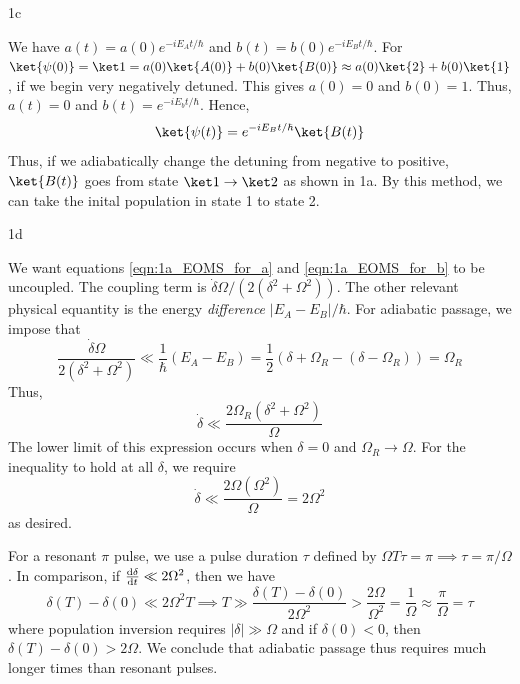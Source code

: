 \documentclass[12pt]{article}
\begin{document}
\begin{exc}{1c}

\end{exc}
\begin{ans}
    We have $a(t) = a(0)e^{-i E_At/\hbar}$ and $b(t) = b(0) e^{-i E_Bt/\hbar}$. For $\ket{\psi(0)} = \ket 1 = a(0)\ket{A(0)} + b(0) \ket{B(0)} \approx a(0)\ket{2} + b(0) \ket{1}$, if we begin very negatively detuned. This gives $a(0) = 0$ and $b(0) = 1$. Thus, $a(t) = 0$ and $b(t) = e^{-iE_bt/\hbar}$. Hence, 
    \[\ket{\psi(t)} = e^{-iE_Bt/\hbar}\ket{B(t)}\]
    Thus, if we adiabatically change the detuning from negative to positive, $\ket{B(t)}$ goes from state $\ket 1 \to \ket 2$ as shown in 1a. By this method, we can take the inital population in state 1 to state 2. 
\end{ans}


\begin{exc}{1d}

\end{exc}
\begin{ans}
    We want equations \ref{eqn:1a_EOMS_for_a} and \ref{eqn:1a_EOMS_for_b} to be uncoupled. The coupling term is $\dot \delta \Omega/(2 (\delta^2 + \Omega^2))$. The other relevant physical equantity is the energy \emph{difference} $|E_A - E_B|/\hbar$. For adiabatic passage, we impose that
    \[\frac{\dot \delta \Omega}{2 (\delta^2 + \Omega^2)} \ll \frac1\hbar(E_A - E_B) = \frac12(\delta + \Omega_R - (\delta - \Omega_R)) = \Omega_R\]
    Thus,
    \[\dot \delta \ll \frac{2\Omega_R(\delta^2 + \Omega^2)}{\Omega}\]
    The lower limit of this expression occurs when $\delta = 0$ and $\Omega_R \to \Omega$. For the inequality to hold at all $\delta$, we require 
    \[\dot \delta \ll \frac{2\Omega(\Omega^2)}{\Omega} = 2\Omega^2\]
    as desired.

    For a resonant $\pi$ pulse, we use a pulse duration $\tau$ defined by $\Omega T\tau = \pi \implies \tau = \pi/\Omega$. In comparison, if $\odv{\delta}{t} \ll 2\Omega^2$, then we have 
    \[\delta(T) - \delta(0) \ll 2\Omega^2 T \implies T \gg \frac{\delta(T) - \delta(0)}{2\Omega^2} > \frac{2\Omega}{\Omega^2} = \frac1\Omega \approx \frac{\pi}{\Omega} = \tau\]
    where population inversion requires $|\delta| \gg \Omega$ and if $\delta(0) < 0$, then $\delta(T) - \delta(0) > 2\Omega$. We conclude that adiabatic passage thus requires much longer times than resonant pulses.
\end{ans}
\end{document}
